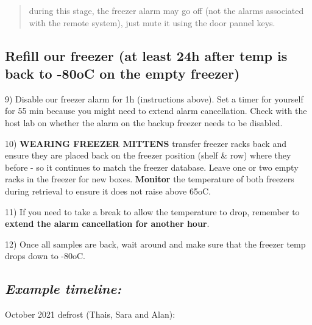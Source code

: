 \documentclass[
  letterpaper,
  DIV=11,
  numbers=noendperiod]{scrreprt}
\begin{document}
\begin{quote}
during this stage, the freezer alarm may go off (not the alarms
associated with the remote system), just mute it using the door pannel
keys.
\end{quote}

\hypertarget{refill-our-freezer-at-least-24h-after-temp-is-back-to--80oc-on-the-empty-freezer}{%
\subsection*{\texorpdfstring{\textbf{Refill our freezer (at least 24h
after temp is back to -80oC on the empty
freezer)}}{Refill our freezer (at least 24h after temp is back to -80oC on the empty freezer)}}\label{refill-our-freezer-at-least-24h-after-temp-is-back-to--80oc-on-the-empty-freezer}}

9) Disable our freezer alarm for 1h (instructions above). Set a timer
for yourself for 55 min because you might need to extend alarm
cancellation. Check with the host lab on whether the alarm on the backup
freezer needs to be disabled.

10) \textbf{WEARING FREEZER MITTENS} transfer freezer racks back and
ensure they are placed back on the freezer position (shelf \& row) where
they before - so it continues to match the freezer database. Leave one
or two empty racks in the freezer for new boxes. \textbf{Monitor} the
temperature of both freezers during retrieval to ensure it does not
raise above 65oC.

11) If you need to take a break to allow the temperature to drop,
remember to \textbf{extend the alarm cancellation for another hour}.

12) Once all samples are back, wait around and make sure that the
freezer temp drops down to -80oC.

\hypertarget{example-timeline}{%
\subsection*{\texorpdfstring{\textbf{\emph{Example
timeline:}}}{Example timeline:}}\label{example-timeline}}

October 2021 defrost (Thais, Sara and Alan):
\end{document}
